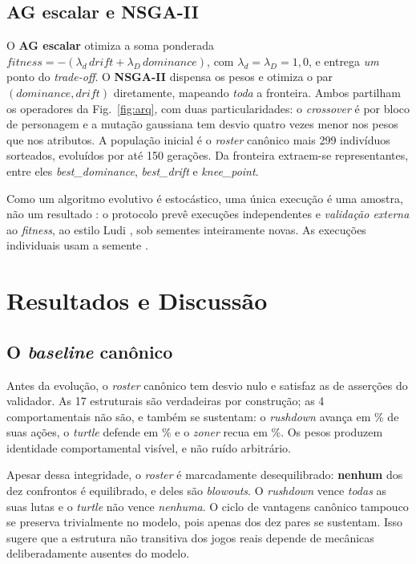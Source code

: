 \documentclass[10pt,conference]{IEEEtran}
\begin{document}
\subsection{AG escalar e NSGA-II}

O \textbf{AG escalar} otimiza a soma ponderada
$\textit{fitness} = -(\lambda_{d}\,\textit{drift} + \lambda_{D}\,\textit{dominance})$,
com $\lambda_{d}=\lambda_{D}=1{,}0$, e entrega \emph{um} ponto do \emph{trade-off}. O
\textbf{NSGA-II} \cite{deb2002nsga} dispensa os pesos e otimiza o par
$(\textit{dominance}, \textit{drift})$ diretamente, mapeando \emph{toda} a
fronteira. Ambos partilham os operadores da
Fig.~\ref{fig:arq}, com duas particularidades: o \emph{crossover} é por bloco de
personagem e a mutação gaussiana tem desvio quatro vezes menor nos pesos que nos
atributos. A população inicial é o \emph{roster} canônico mais 299 indivíduos
sorteados, evoluídos por até 150 gerações. Da fronteira extraem-se
representantes, entre eles \emph{best\_dominance}, \emph{best\_drift} e
\emph{knee\_point}.

Como um algoritmo evolutivo é estocástico, uma única execução é uma amostra, não um
resultado \cite{eiben2015introduction}: o protocolo prevê \nSeeds{} execuções
independentes e \emph{validação externa} ao \emph{fitness}, ao estilo Ludi
\cite{browne2010evolutionary}, sob sementes inteiramente novas. As execuções
individuais usam a semente \seedMain{}.

\section{Resultados e Discussão}

\subsection{O \emph{baseline} canônico}

Antes da evolução, o \emph{roster} canônico tem desvio nulo e satisfaz as \valCan{}
de \valTotal{} asserções do validador. As 17 estruturais são verdadeiras por
construção; as 4 comportamentais não são, e também se sustentam: o \emph{rushdown}
avança em \fpRushAdv{}\% de suas ações, o \emph{turtle} defende em
\fpTurtleDef{}\% e o \emph{zoner} recua em \fpZonerRet{}\%. Os pesos produzem
identidade comportamental visível, e não ruído arbitrário.

Apesar dessa integridade, o \emph{roster} é marcadamente desequilibrado:
\textbf{nenhum} dos dez confrontos é equilibrado, e \blowCan{} deles são
\emph{blowouts}. O \emph{rushdown} vence \emph{todas} as suas lutas e o
\emph{turtle} não vence \emph{nenhuma}. O ciclo de vantagens canônico tampouco se
preserva trivialmente no modelo, pois apenas \cycleCan{} dos dez pares se
sustentam. Isso sugere que a estrutura não transitiva dos jogos reais
depende de mecânicas deliberadamente ausentes do modelo.
\end{document}
